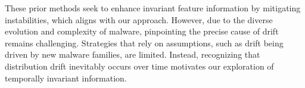 
These prior methods seek to enhance invariant feature information by mitigating instabilities, which aligns with our approach. However, due to the diverse evolution and complexity of malware, pinpointing the precise cause of drift remains challenging. Strategies that rely on assumptions, such as drift being driven by new malware families, are limited. Instead, recognizing that distribution drift inevitably occurs over time motivates our exploration of temporally invariant information.


